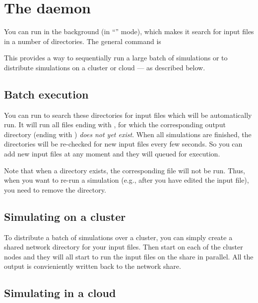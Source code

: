 \section{The \prog daemon}

You can run \prog in the background (in ``'' mode), which makes it search for input files in a number of directories. The general command is


This provides a way to sequentially run a large batch of simulations or to distribute simulations on a cluster or cloud --- as described below.


\subsection{Batch execution}

You can run  to search these directories for input files which will be automatically run. It will run all files ending with , for which the corresponding output directory (ending with ) \emph{does not yet exist}.  When all simulations are finished, the directories will be re-checked for new input files every few seconds. So you can add new input files at any moment and they will queued for execution.

Note that when a directory  exists, the corresponding  file will not be run. Thus, when you want to re-run a simulation (e.g., after you have edited the input file), you need to remove the 
 directory.

\subsection{Simulating on a cluster}

To distribute a batch of simulations over a cluster, you can simply create a shared network directory for your input files. Then start \prog {} \emph{} on each of the cluster nodes
and they will all start to run the input files on the share in parallel. All the output is convieniently written back to the network share.

\subsection{Simulating in a cloud}

